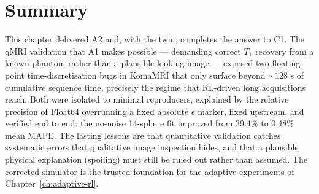 \section{Summary}
\label{sec:komamri-summary}

This chapter delivered A2 and, with the twin, completes the answer to C1. The
qMRI validation that A1 makes possible --- demanding correct $T_1$ recovery
from a known phantom rather than a plausible-looking image --- exposed two
floating-point time-discretisation bugs in KomaMRI that only surface beyond
${\sim}128$ s of cumulative sequence time, precisely the regime that
RL-driven long acquisitions reach. Both were isolated to minimal reproducers,
explained by the relative precision of Float64 overrunning a fixed absolute
$\epsilon$ marker, fixed upstream, and verified end to end: the no-noise
14-sphere fit improved from 39.4\% to 0.48\% mean MAPE. The lasting lessons
are that quantitative validation catches systematic errors that qualitative
image inspection hides, and that a plausible physical explanation (spoiling)
must still be ruled out rather than assumed. The corrected simulator is the
trusted foundation for the adaptive experiments of
Chapter~\ref{ch:adaptive-rl}.
